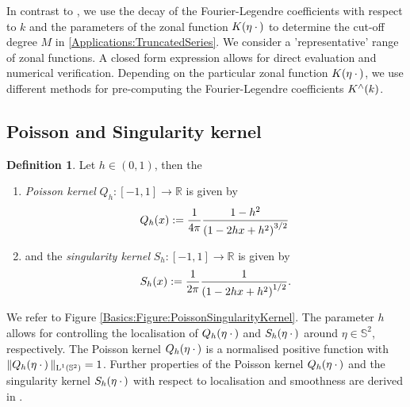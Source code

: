 \documentclass[11pt,a4paper,twoside,bibtotoc]{scrartcl}
\theoremstyle{plain}
\theoremstyle{definition}
\newtheorem{definition}[theorem]{Definition}
\theoremstyle{remark}
\newcommand{\R}{\ensuremath{\mathbb{R}}}
\newcommand{\Ln}[2]{\ensuremath{\text{\rm{L}}^{#1}\left(#2\right)}}
\newcommand{\fun}[2]{\ensuremath{#1{\hspace{-0.4ex}}\left(#2\right)}}
\numberwithin{equation}{section}
\numberwithin{table}{section}
\numberwithin{figure}{section}
\begin{document}
In contrast to \cite{Sc97,bahu01,CaFi}, we use the decay of the
Fourier-Legendre coefficients with respect to $k$ and the parameters of the
zonal function $\fun{K}{\mathbf{\eta} \: \cdot \,}$ to determine the cut-off degree
$M$ in \eqref{Applications:TruncatedSeries}.
We consider a 'representative' range of zonal functions. A closed form expression
allows for direct evaluation and numerical verification. Depending on the 
particular zonal function $\fun{K}{\mathbf{\eta} \: \cdot \,}$, we use different 
methods for pre-computing the Fourier-Legendre coefficients $\fun{K^{\wedge}}{k}$.

\subsection{Poisson and Singularity kernel}
\begin{definition}\label{def:poisson_sing}
  Let $h \in (0,1)$, then the
  \begin{enumerate}
  \item \emph{Poisson kernel}
    $Q_{h}:[-1,1] \rightarrow \R$ is given by
    \[
    \fun{Q_{h}}{x} := \frac{1}{4\pi} \frac{1-h^2}{\left(1-2hx+h^2\right)^{3/2}}\,
    \]
  \item and the \emph{singularity kernel}
    $S_{h}:[-1,1] \rightarrow \R$ is given by
    \[
    \fun{S_{h}}{x} := \frac{1}{2\pi} \frac{1}{\left(1-2hx+h^2\right)^{1/2}}.
    \]
  \end{enumerate}
\end{definition}

We refer to Figure \ref{Basics:Figure:PoissonSingularityKernel}. The parameter 
$h$ allows for controlling the localisation of 
$\fun{Q_{h}}{\mathbf{\eta} \: \cdot \,}$ and $\fun{S_{h}}{\mathbf{\eta} \: \cdot \,}$ 
around $\eta \in \mathbb{S}^2$, respectively.
The Poisson kernel $\fun{Q_{h}}{\mathbf{\eta} \: \cdot \,}$ is a normalised positive function with
$\|\fun{Q_{h}}{\mathbf{\eta} \: \cdot \,}\|_{\Ln{1}{\mathbb{S}^2}}=1$.
Further properties of the Poisson kernel $\fun{Q_{h}}{\mathbf{\eta} \: \cdot \,}$ and the 
singularity kernel $\fun{S_{h}}{\mathbf{\eta} \: \cdot \,}$
with respect to localisation and smoothness are derived
in \cite[pp. 112]{frgesc}.
\end{document}
